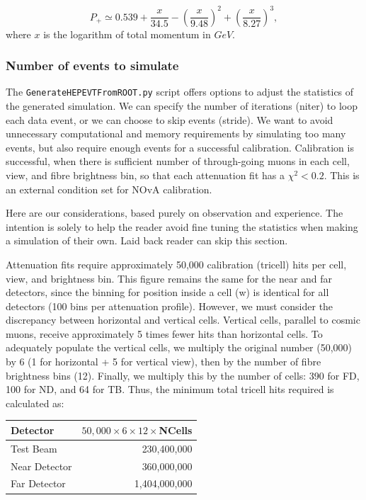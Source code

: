 \documentclass[12pt]{article}
\begin{document}

\begin{equation}
P_+ \simeq 0.539 + \frac{x}{34.5}-\left(\frac{x}{9.48}\right)^2 + \left(\frac{x}{8.27}\right)^3,
\end{equation}
where $x$ is the logarithm of total momentum in $\unit{GeV}$.

\subsubsection{Number of events to simulate}\label{secNumEvents}
The \texttt{GenerateHEPEVTFromROOT.py} script offers options to adjust the statistics of the generated simulation. We can specify the number of iterations (niter) to loop each data event, or we can choose to skip events (stride). We want to avoid unnecessary computational and memory requirements by simulating too many events, but also require enough events for a successful calibration. Calibration is successful, when there is sufficient number of through-going muons in each cell, view, and fibre brightness bin, so that each attenuation fit has a $\chi^2<0.2$. This is an external condition set for NOvA calibration.

Here are our considerations, based purely on observation and experience. The intention is solely to help the reader avoid fine tuning the statistics when making a simulation of their own. Laid back reader can skip this section.

Attenuation fits require approximately 50,000 calibration (tricell) hits per cell, view, and brightness bin. This figure remains the same for the near and far detectors, since the binning for position inside a cell (w) is identical for all detectors (100 bins per attenuation profile). However, we must consider the discrepancy between horizontal and vertical cells. Vertical cells, parallel to cosmic muons, receive approximately 5 times fewer hits than horizontal cells. To adequately populate the vertical cells, we multiply the original number (50,000) by 6 (1 for horizontal + 5 for vertical view), then by the number of fibre brightness bins (12). Finally, we multiply this by the number of cells: 390 for FD, 100 for ND, and 64 for TB. Thus, the minimum total tricell hits required is calculated as:
\begin{center}
\begin{tabular}{lr}
Detector & $50,000\times 6\times 12\times$NCells\\\hline
Test Beam & 230,400,000\\
Near Detector & 360,000,000\\
Far Detector & 1,404,000,000
\end{tabular}
\end{center}
\end{document}
